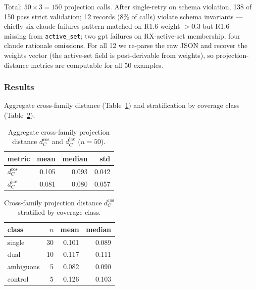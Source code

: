Total: $50 \times 3 = 150$ projection calls. After single-retry on schema violation, 138 of 150 pass strict validation; 12 records (8\% of calls) violate schema invariants --- chiefly six claude failures pattern-matched on R1.6 weight $> 0.3$ but R1.6 missing from \texttt{active\_set}; two gpt failures on RX-active-set membership; four claude rationale omissions. For all 12 we re-parse the raw JSON and recover the weights vector (the active-set field is post-derivable from weights), so projection-distance metrics are computable for all 50 examples.

\subsubsection{Results}
\label{sec:results:exp1:results}

Aggregate cross-family distance (Table~\ref{tab:dc_aggregate}) and stratification by coverage class (Table~\ref{tab:dc_by_class}):

\begin{table}[t]
\centering
\caption{Aggregate cross-family projection distance $d_C^{\cos}$ and $d_C^{\text{jac}}$ ($n = 50$).}
\label{tab:dc_aggregate}
\begin{tabular}{lrrr}
\toprule
\textbf{metric} & \textbf{mean} & \textbf{median} & \textbf{std} \\
\midrule
$d_C^{\cos}$    & 0.105 & 0.093 & 0.042 \\
$d_C^{\text{jac}}$ & 0.081 & 0.080 & 0.057 \\
\bottomrule
\end{tabular}
\end{table}

\begin{table}[t]
\centering
\caption{Cross-family projection distance $d_C^{\cos}$ stratified by coverage class.}
\label{tab:dc_by_class}
\begin{tabular}{lrrr}
\toprule
\textbf{class} & $n$ & \textbf{mean} & \textbf{median} \\
\midrule
single    & 30 & 0.101 & 0.089 \\
dual      & 10 & 0.117 & 0.111 \\
ambiguous &  5 & 0.082 & 0.090 \\
control   &  5 & 0.126 & 0.103 \\
\bottomrule
\end{tabular}
\end{table}

